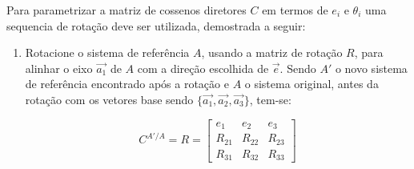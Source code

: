 Para parametrizar a  matriz de cossenos diretores \begin{math} C\end{math} em termos de \begin{math} e_i\end{math} e \begin{math} \theta_i\end{math} uma sequencia de rotação deve ser utilizada, demostrada a seguir:
\begin{enumerate}

\item Rotacione o sistema de referência \begin{math} A \end{math}, usando a matriz de rotação \begin{math} R \end{math}, para alinhar o eixo \begin{math} \vec{a_1}\end{math} de \begin{math} A\end{math} com a direção escolhida de \begin{math} \vec{e}\end{math}. Sendo \begin{math} A'\end{math} o novo sistema de referência encontrado após a rotação e \begin{math} A \end{math} o sistema original, antes da rotação com os vetores base sendo \begin{math} \{\vec{a_1}, \vec{a_2}, \vec{a_3}\}\end{math}, tem-se:

\begin{equation} C^{A'/A}=R=\begin{bmatrix}
e_1 & e_2 &e_3 \\
R_{21} & R_{22} & R_{23} \\
R_{31} & R_{32}  & R_{33}
\end{bmatrix}\end{equation}


\end{enumerate}
